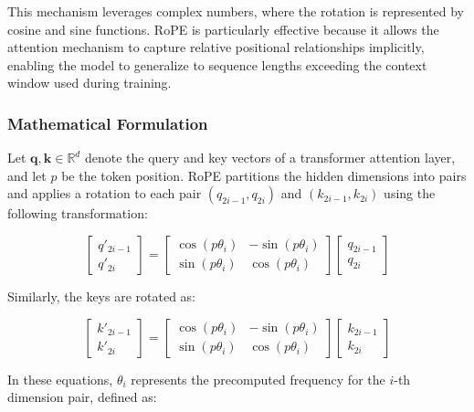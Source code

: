 This mechanism leverages complex numbers, where the rotation is represented by cosine and sine functions. RoPE is particularly effective because it allows the attention mechanism to capture relative positional relationships implicitly, enabling the model to generalize to sequence lengths exceeding the context window used during training.

\subsubsection{Mathematical Formulation}
Let $\mathbf{q}, \mathbf{k} \in \mathbb{R}^d$ denote the query and key vectors of a transformer attention layer, and let $p$ be the token position. RoPE partitions the hidden dimensions into pairs and applies a rotation to each pair $(q_{2i-1}, q_{2i})$ and $(k_{2i-1}, k_{2i})$ using the following transformation:



\begin{equation}
\begin{bmatrix}
q'_{2i-1} \\
q'_{2i}
\end{bmatrix}
=
\begin{bmatrix}
\cos(p\theta_i) & -\sin(p\theta_i) \\
\sin(p\theta_i) & \cos(p\theta_i)
\end{bmatrix}
\begin{bmatrix}
q_{2i-1} \\
q_{2i}
\end{bmatrix}
\end{equation}

Similarly, the keys are rotated as:

\begin{equation}
\begin{bmatrix}
k'_{2i-1} \\
k'_{2i}
\end{bmatrix}
=
\begin{bmatrix}
\cos(p\theta_i) & -\sin(p\theta_i) \\
\sin(p\theta_i) & \cos(p\theta_i)
\end{bmatrix}
\begin{bmatrix}
k_{2i-1} \\
k_{2i}
\end{bmatrix}
\end{equation}

In these equations, $\theta_i$ represents the precomputed frequency for the $i$-th dimension pair, defined as:

